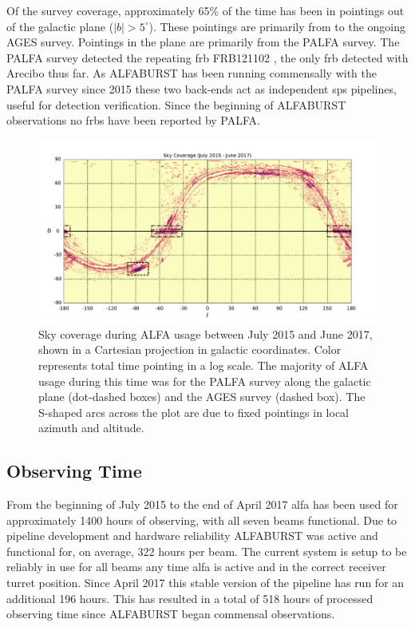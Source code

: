 \documentclass[a4paper,fleqn,usenatbib]{mnras}
\begin{document}
Of the survey coverage, approximately 65\% of the time has been in pointings out
of the galactic plane ($|b| > 5^{\circ}$).  These pointings are primarily from
to the ongoing AGES survey.  Pointings in the plane are primarily from the PALFA
survey.  The PALFA survey detected the repeating \gls{frb} FRB121102
\citep{2014ApJ...790..101S}, the only \gls{frb} detected with Arecibo thus far.
As ALFABURST has been running commensally with the PALFA survey since 2015 these
two back-ends act as independent \gls{sps} pipelines, useful for detection
verification.  Since the beginning of ALFABURST observations no \glspl{frb} have
been reported by PALFA.

\begin{figure}
    \includegraphics[width=1.0\linewidth]{figures/cartview_sky_coverage.pdf}
    \caption{Sky coverage during ALFA usage between July 2015 and June 2017,
    shown in a Cartesian projection in galactic coordinates. Color represents
    total time pointing in a log scale. The majority of ALFA usage during this
    time was for the PALFA survey along the galactic plane (dot-dashed boxes)
    and the AGES survey (dashed box).  The S-shaped arcs across the plot are due
    to fixed pointings in local azimuth and altitude.
    }
    \label{fig:sky_coverage}
\end{figure}



\subsection{Observing Time}
\label{sec:obs_time}

From the beginning of July 2015 to the end of April 2017 \gls{alfa} has been
used for approximately 1400 hours of observing, with all seven beams functional.
Due to pipeline development and hardware reliability ALFABURST was active and
functional for, on average, 322 hours per beam.  The current system is setup to
be reliably in use for all beams any time \gls{alfa} is active and in the
correct receiver turret position. Since April 2017 this stable version of the
pipeline has run for an additional 196 hours. This has resulted in a total of
518 hours of processed observing time since ALFABURST began commensal observations.
\end{document}
